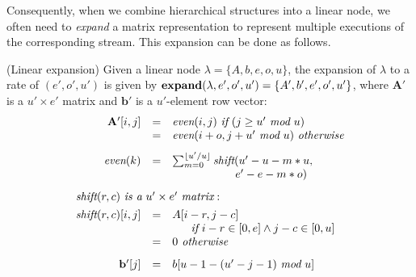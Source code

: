 Consequently, when we combine hierarchical structures into a linear
node, we often need to {\it expand} a matrix representation to
represent multiple executions of the corresponding stream.  This
expansion can be done as follows.


\begin{definition} (Linear expansion)
Given a linear node $\lambda = \{A, b, e, o, u\}$, the expansion of
$\lambda$ to a rate of $(e', o', u')$ is given by $\mbox{\bf
expand}(\lambda, e', o', u') = \{A', b', e', o', u'\}$, where
$\mathbf{A'}$ is a $u' \times e'$ matrix and $\mathbf{b'}$ is a
$u'$-element row vector:
\vspace{-6pt} \\
\begin{equation} \nonumber
\begin{array}{rcl}
\mathbf{A'}[i,j] & = & \mt{even}(i,j) ~\mt{if}~ (j \ge u'~\mt{mod}~u) \\
~ & = & \mt{even}(i+o, j+u'~\mt{mod}~u) ~\mt{otherwise} \\ ~ \vspace{-4pt} \\
%
\mt{even}(k)& = & \sum_{m=0}^{\lfloor u' / u \rfloor}
\mt{shift}(u'- u -m*u, \\
~ & ~ & ~ \hspace{0.68in}~ e'-e-m*o) \\ ~ \vspace{-4pt} \\
%
\multicolumn{3}{l}{\mt{shift}(r,c) ~\mt{is a}~ u' \times e' ~\mt{matrix}:} \\ ~ \vspace{-8pt} \\
\mt{shift}(r,c)[i,j] & = & A[i-r,j-c] \\
~ & ~ & ~~~~~\mt{if}~ i-r \in [0,e] \wedge j-c \in [0, u] \\
~ & = & 0 \mt{~otherwise} \\ \vspace{-4pt} \\
%
\mathbf{b'}[j] & = & b[u-1-(u'-j-1)~\mt{mod}~u]
\end{array}
\end{equation}
\end{definition}

